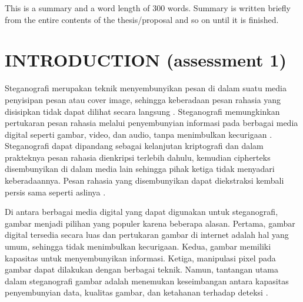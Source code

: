 \documentclass{ittelkom}
\begin{document}

{This is a summary and a word length of 300 words. Summary is written briefly from the entire contents of the thesis/proposal and so on until it is finished.}

\newpage
\section{INTRODUCTION \color{red} (assessment 1)}
Steganografi merupakan teknik menyembunyikan pesan di dalam suatu media penyisipan pesan atau cover image,
sehingga keberadaan pesan rahasia yang disisipkan tidak dapat dilihat secara langsung \cite{pujianto2021uji}. Steganografi
memungkinkan pertukaran pesan rahasia melalui penyembunyian informasi pada berbagai media digital seperti gambar, video, dan audio,
tanpa menimbulkan kecurigaan \cite{siaulhak2023sistem}. Steganografi dapat dipandang sebagai kelanjutan
kriptografi dan dalam prakteknya pesan rahasia dienkripsi terlebih dahulu, kemudian
cipherteks disembunyikan di dalam media lain sehingga pihak ketiga tidak menyadari
keberadaannya. Pesan rahasia yang disembunyikan dapat diekstraksi kembali persis
sama seperti aslinya \cite{soetarmono2012studi}.

Di antara berbagai media digital yang dapat digunakan untuk steganografi,
gambar menjadi pilihan yang populer karena beberapa alasan. Pertama, gambar
digital tersedia secara luas dan pertukaran gambar di internet adalah hal yang
umum, sehingga tidak menimbulkan kecurigaan. Kedua, gambar memiliki kapasitas
untuk menyembunyikan informasi. Ketiga, manipulasi pixel pada gambar dapat
dilakukan dengan berbagai teknik. Namun, tantangan utama dalam steganografi
gambar adalah menemukan keseimbangan antara kapasitas penyembunyian data,
kualitas gambar, dan ketahanan terhadap deteksi \cite{fikri2022optimasi}.
\end{document}
